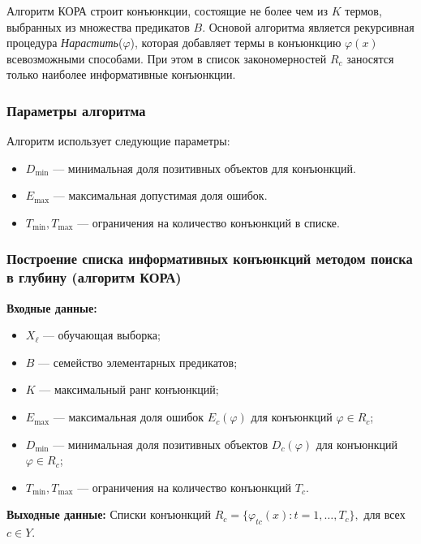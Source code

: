Алгоритм КОРА строит конъюнкции, состоящие не более чем из \(K\) термов, выбранных из множества предикатов \(B\). Основой алгоритма является рекурсивная процедура \textit{Нарастить}(\(\varphi\)), которая добавляет термы в конъюнкцию \(\varphi(x)\) всевозможными способами. При этом в список закономерностей \(R_c\) заносятся только наиболее информативные конъюнкции.

\subsubsection{Параметры алгоритма}

Алгоритм использует следующие параметры:

\begin{itemize}
    \item \(D_{\text{min}}\) — минимальная доля позитивных объектов для конъюнкций.
    \item \(E_{\text{max}}\) — максимальная допустимая доля ошибок.
    \item \(T_{\text{min}}, T_{\text{max}}\) — ограничения на количество конъюнкций в списке.
\end{itemize}

\subsubsection{Построение списка информативных конъюнкций методом поиска в глубину (алгоритм КОРА)}

\textbf{Входные данные:}
\begin{itemize}
    \item \(X_\ell\) — обучающая выборка;
    \item \(B\) — семейство элементарных предикатов;
    \item \(K\) — максимальный ранг конъюнкций;
    \item \(E_{\text{max}}\) — максимальная доля ошибок \(E_c(\varphi)\) для конъюнкций \(\varphi \in R_c\);
    \item \(D_{\text{min}}\) — минимальная доля позитивных объектов \(D_c(\varphi)\) для конъюнкций \(\varphi \in R_c\);
    \item \(T_{\text{min}}, T_{\text{max}}\) — ограничения на количество конъюнкций \(T_c\).
\end{itemize}

\textbf{Выходные данные:}
Списки конъюнкций \(R_c = \{ \varphi_{tc}(x) : t = 1, \dots, T_c \}, \) для всех \(c \in Y\).


